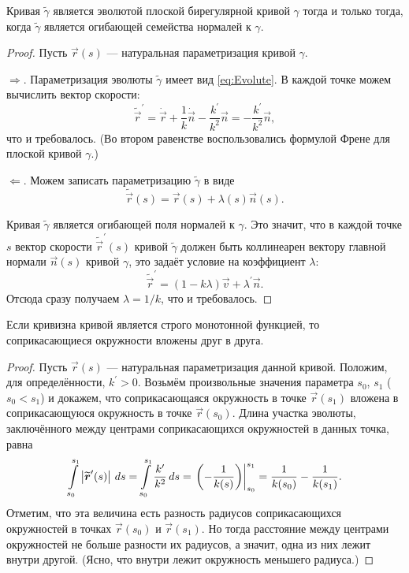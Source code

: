 \begin{proposition} \label{proposition:NormalEnvelope}
	Кривая $\widetilde{\gamma}$ является эволютой плоской бирегулярной кривой $\gamma$ тогда и только тогда, когда $\widetilde{\gamma}$ является огибающей семейства нормалей к $\gamma$.
\end{proposition}

\begin{proof}
	Пусть $\vec{r}(s)$ --- натуральная параметризация кривой $\gamma$.

	$\Rightarrow$. Параметризация эволюты $\widetilde{\gamma}$ имеет вид \eqref{eq:Evolute}. В каждой точке можем вычислить вектор скорости:\footnotemark
	\[
		\widetilde{\vec{r}}^\prime = \dot{\vec{r}} + \frac{1}{k}\dot{\vec{n}} - \frac{k^\prime}{k^2}\vec{n} = -\frac{k^\prime}{k^2}\vec{n},
	\]
	что и требовалось. (Во втором равенстве воспользовались формулой Френе для плоской кривой $\gamma$.)

	$\Leftarrow$. Можем записать параметризацию $\widetilde{\gamma}$ в виде
	\[
		\widetilde{\vec{r}}(s) = \vec{r}(s) + \lambda(s)\vec{n}(s).
	\]

	Кривая $\widetilde{\gamma}$ является огибающей поля нормалей к $\gamma$. Это значит, что в каждой точке $s$ вектор скорости $\widetilde{\vec{r}}^\prime(s)$ кривой $\widetilde{\gamma}$ должен быть коллинеарен вектору главной нормали $\vec{n}(s)$ кривой $\gamma$, это задаёт условие на коэффициент $\lambda$:
	\[
		\widetilde{\vec{r}}^\prime = (1 - k\lambda)\vec{v} + \lambda^\prime\vec{n}.
	\]
	Отсюда сразу получаем $\lambda = 1 / k$, что и требовалось.
\end{proof}


\begin{theorem}
	Если кривизна кривой является строго монотонной функцией, то соприкасающиеся окружности вложены друг в друга.
\end{theorem}

\begin{proof}
	Пусть $\vec{r}(s)$ --- натуральная параметризация данной кривой. Положим, для определённости, $k^\prime > 0$. Возьмём произвольные значения параметра $s_0$, $s_1$ ($s_0 < s_1$) и докажем, что соприкасающаяся окружность в точке $\vec{r}(s_1)$ вложена в соприкасающуюся окружность в точке $\vec{r}(s_0)$. Длина участка эволюты, заключённого между центрами соприкасающихся окружностей в данных точка, равна
	\[
		\int\limits_{s_0}^{s_1}\left\lvert\widetilde{\boldsymbol{r}}^\prime(s)\right\rvert\,ds = \int\limits_{s_0}^{s_1}\frac{k^\prime}{k^2}\,ds = \left.\left(-\frac{1}{k(s)}\right)\right|_{s_0}^{s_1} = \frac{1}{k(s_0)} - \frac{1}{k(s_1)}.
	\]
	Отметим, что эта величина есть разность радиусов соприкасающихся окружностей в точках $\vec{r}(s_0)$ и $\vec{r}(s_1)$. Но тогда расстояние между центрами окружностей не больше разности их радиусов, а значит, одна из них лежит внутри другой. (Ясно, что внутри лежит окружность меньшего радиуса.)
\end{proof}

